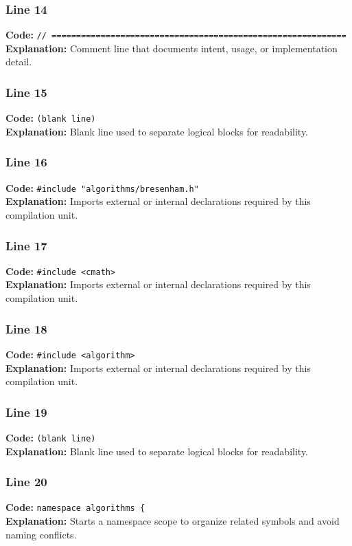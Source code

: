\documentclass[11pt,a4paper]{article}
\begin{document}
\subsubsection*{Line 14}
\textbf{Code:} \verb|// ============================================================|\\
\textbf{Explanation:} Comment line that documents intent, usage, or implementation detail.

\subsubsection*{Line 15}
\textbf{Code:} \texttt{(blank line)}\\
\textbf{Explanation:} Blank line used to separate logical blocks for readability.

\subsubsection*{Line 16}
\textbf{Code:} \verb|#include "algorithms/bresenham.h"|\\
\textbf{Explanation:} Imports external or internal declarations required by this compilation unit.

\subsubsection*{Line 17}
\textbf{Code:} \verb|#include <cmath>|\\
\textbf{Explanation:} Imports external or internal declarations required by this compilation unit.

\subsubsection*{Line 18}
\textbf{Code:} \verb|#include <algorithm>|\\
\textbf{Explanation:} Imports external or internal declarations required by this compilation unit.

\subsubsection*{Line 19}
\textbf{Code:} \texttt{(blank line)}\\
\textbf{Explanation:} Blank line used to separate logical blocks for readability.

\subsubsection*{Line 20}
\textbf{Code:} \verb|namespace algorithms {|\\
\textbf{Explanation:} Starts a namespace scope to organize related symbols and avoid naming conflicts.
\end{document}
